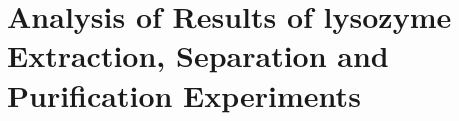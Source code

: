 % 
%
%
% 
%

\chapter{Analysis of Results of lysozyme Extraction, Separation and Purification Experiments}







